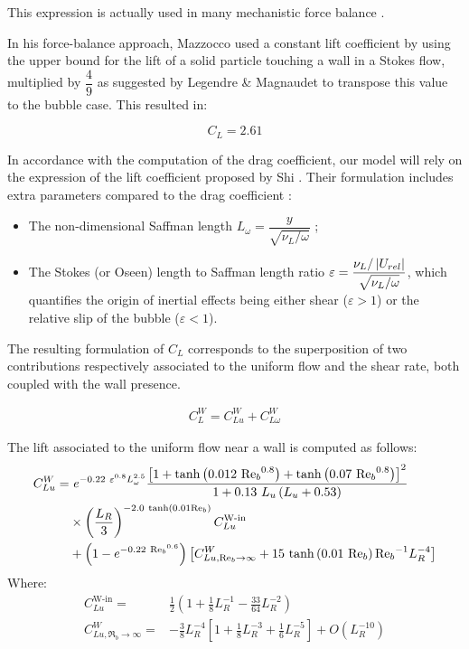 This expression is actually used in many mechanistic force balance \cite{klausner_vapor_1993, chen_prediction_2012, sugrue_modified_2016, ren_development_2020}.


\npar

In his force-balance approach, Mazzocco \etal \cite{mazzocco_reassessed_2018} used a constant lift coefficient by using the upper bound for the lift of a solid particle touching a wall in a Stokes flow, multiplied by $\dfrac{4}{9}$ as suggested by Legendre \& Magnaudet \cite{legendre_lift_1998} to transpose this value to the bubble case. This resulted in:

\begin{equation}
C_{L} = 2.61
\end{equation}


\npar

In accordance with the computation of the drag coefficient, our model will rely on the expression of the lift coefficient proposed by Shi \etal \cite{shi_drag_2021}. Their formulation includes extra parameters compared to the drag coefficient :
\begin{itemize}
\item The non-dimensional Saffman length $L_{\omega} = \dfrac{y}{\sqrt{\nu_{L} / \omega}}$ ;
\item The Stokes (or Oseen) length to Saffman length ratio $\varepsilon = \dfrac{\nu_{L} / \left| U_{rel} \right|}{\sqrt{\nu_{L} / \omega}}$, which quantifies the origin of inertial effects being either shear ($\varepsilon >1$) or the relative slip of the bubble ($\varepsilon < 1$).

\end{itemize}  

The resulting formulation of $C_{L}$ corresponds to the superposition of two contributions respectively associated to the uniform flow and the shear rate, both coupled with the wall presence. 

\begin{align}
C_{L}^{W} =C_{Lu}^{W} + C_{L\omega}^{W}
\label{eq:lift_shi}
\end{align}



The lift associated to the uniform flow near a wall is computed as follows:
\begin{align}
\nonumber C_{Lu}^{W} =&\  e^{-0.22\ \varepsilon^{0.8}L_{\omega}^{2.5}} \frac{ \crocht{1 + \tanh{0.012\ {\Re_{b}}^{0.8}} + \tanh{0.07\ {\Re_{b}}^{0.8}} }^{2} } {1+0.13\ L_{u} \parth{L_{u}+0.53} } \\
%
\nonumber			&\times  \parth{\frac{L_{R}}{3}}^{-2.0\ \tanh{0.01\Re_{b}}}  C_{Lu}^{\text{W-in}}\\
%
&+\parth{1-e^{-0.22\ {\Re_{b}}^{0.6}} } \crocht{ C_{Lu,\Re_{b}\to \infty}^{W} + 15\ \tanh{ 0.01\ \Re_{b} }{\Re_{b}}^{-1} L_{R}^{-4} }
%
\end{align}
Where:
\begin{align}
C_{Lu}^{\text{W-in}}=&\frac{1}{2}\left(1+\frac{1}{8}L_{R}^{-1}-\frac{33}{64}L_{R}^{-2}\right)\\
%
C_{Lu, \Re_{b} \to \infty}^{W} = & -\frac{3}{8}L_{R}^{-4}\left[1+\frac{1}{8}L_{R}^{-3}+\frac{1}{6}L_{R}^{-5}\right] + O\left(L_{R}^{-10}\right)
\end{align}


